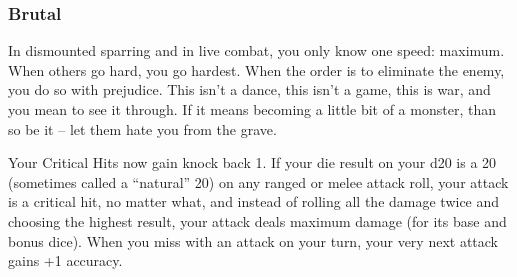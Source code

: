 \subsubsection{Brutal}

\begin{talent}
{In dismounted sparring and in live combat, you only know one speed: maximum. When others go hard, you go hardest. When the order is to eliminate the enemy, you do so with prejudice. This isn't a dance, this isn't a game, this is war, and you mean to see it through. If it means becoming a little bit of a monster, than so be it -- let them hate you from the grave.} 

Your Critical Hits now gain knock back 1. 
If your die result on your d20 is a 20 (sometimes called a ``natural'' 20) on any ranged or melee attack roll, your attack is a critical hit, no matter what, and instead of rolling all the damage twice and choosing the highest result, your attack deals maximum damage (for its base and bonus dice). 
When you miss with an attack on your turn, your very next attack gains +1 accuracy.
\end{talent}
